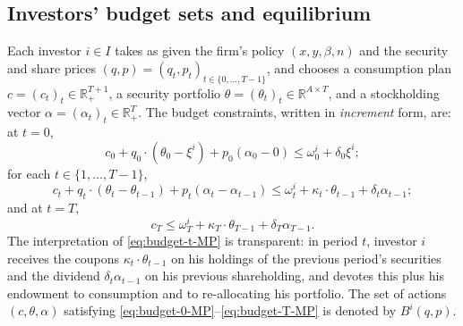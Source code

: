 \documentclass[11pt,a4paper,oneside]{book}
\def\R{\mathbb{R}}
\def\leq{\leqslant}
\theoremstyle{plain}
\theoremstyle{definition}
\theoremstyle{remark}
\numberwithin{equation}{chapter}
\begin{document}
\subsection{Investors' budget sets and equilibrium}

Each investor $i \in I$ takes as given the firm's policy $(x, y, \beta, n)$ and the security and share prices $(q, p) = (q_t, p_t)_{t \in \{0, \ldots, T-1\}}$, and chooses a consumption plan $c = (c_t)_{t} \in \R_+^{T+1}$, a security portfolio $\theta = (\theta_t)_t \in \R^{A \times T}$, and a stockholding vector $\alpha = (\alpha_t)_t \in \R_+^T$.
The budget constraints, written in \emph{increment} form, are: at $t=0$,
\begin{equation}\label{eq:budget-0-MP}
  c_0 + q_0 \cdot (\theta_0 - \xi^i) + p_0 (\alpha_0 - 0)
  \leq \omega^i_0 + \delta_0 \xi^i;
\end{equation}
for each $t \in \{1, \ldots, T-1\}$,
\begin{equation}\label{eq:budget-t-MP}
  c_t + q_t \cdot (\theta_t - \theta_{t-1}) + p_t (\alpha_t - \alpha_{t-1})
  \leq \omega^i_t + \kappa_t \cdot \theta_{t-1} + \delta_t \alpha_{t-1};
\end{equation}
and at $t = T$,
\begin{equation}\label{eq:budget-T-MP}
  c_T \leq \omega^i_T + \kappa_T \cdot \theta_{T-1} + \delta_T \alpha_{T-1}.
\end{equation}
The interpretation of \eqref{eq:budget-t-MP} is transparent: in period $t$, investor $i$ receives the coupons $\kappa_t \cdot \theta_{t-1}$ on his holdings of the previous period's securities and the dividend $\delta_t \alpha_{t-1}$ on his previous shareholding, and devotes this plus his endowment to consumption and to re-allocating his portfolio.
The set of actions $(c, \theta, \alpha)$ satisfying \eqref{eq:budget-0-MP}--\eqref{eq:budget-T-MP} is denoted by $B^i(q, p)$.
\end{document}
